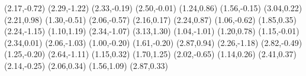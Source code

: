 \psdot[](2.17,-0.72)
\psdot[](2.29,-1.22)
\psdot[](2.33,-0.19)
\psdot[](2.50,-0.01)
\psdot[](1.24,0.86)
\psdot[](1.56,-0.15)
\psdot[](3.04,0.22)
\psdot[](2.21,0.98)
\psdot[](1.30,-0.51)
\psdot[](2.06,-0.57)
\psdot[](2.16,0.17)
\psdot[](2.24,0.87)
\psdot[](1.06,-0.62)
\psdot[](1.85,0.35)
\psdot[](2.24,-1.15)
\psdot[](1.10,1.19)
\psdot[](2.34,-1.07)
\psdot[](3.13,1.30)
\psdot[](1.04,-1.01)
\psdot[](1.20,0.78)
\psdot[](1.15,-0.01)
\psdot[](2.34,0.01)
\psdot[](2.06,-1.03)
\psdot[](1.00,-0.20)
\psdot[](1.61,-0.20)
\psdot[](2.87,0.94)
\psdot[](2.26,-1.18)
\psdot[](2.82,-0.49)
\psdot[](1.25,-0.20)
\psdot[](2.64,-1.11)
\psdot[](1.15,0.32)
\psdot[](1.70,1.25)
\psdot[](2.02,-0.65)
\psdot[](1.14,0.26)
\psdot[](2.41,0.37)
\psdot[](2.14,-0.25)
\psdot[](2.06,0.34)
\psdot[](1.56,1.09)
\psdot[](2.87,0.33)
